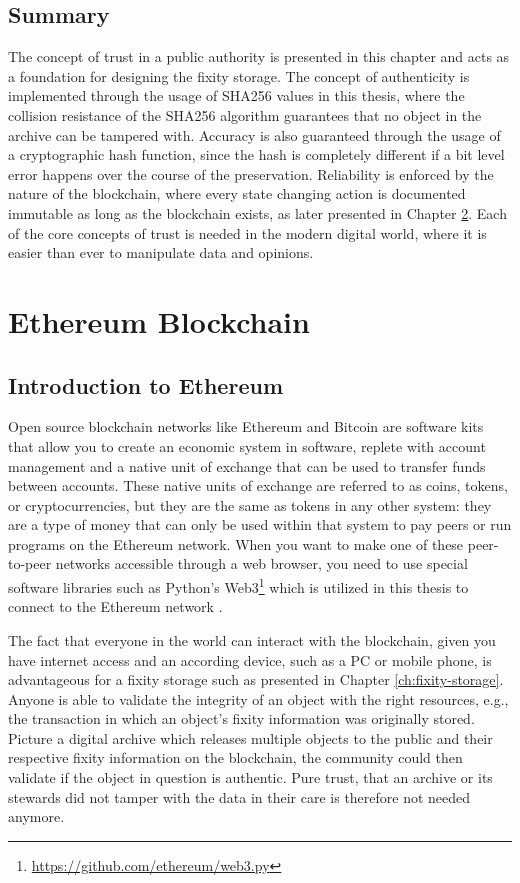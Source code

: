 \documentclass[final]{vutinfth}
\begin{document}
\section{Summary}
The concept of trust in a public authority is presented in this chapter and acts as a foundation for designing the fixity storage. The concept of authenticity is implemented through the usage of SHA256 values in this thesis, where the collision resistance of the SHA256 algorithm guarantees that no object in the archive can be tampered with. Accuracy is also guaranteed through the usage of a cryptographic hash function, since the hash is completely different if a bit level error happens over the course of the preservation.
Reliability is enforced by the nature of the blockchain, where every state changing action is documented immutable as long as the blockchain exists, as later presented in Chapter \ref{ch:ethereum}. Each of the core concepts of trust is needed in the modern digital world, where it is easier than ever to manipulate data and opinions. 
\chapter{Ethereum Blockchain}
\label{ch:ethereum}
\section{Introduction to Ethereum}
\label{sec:eth-blockchain}
Open source blockchain networks like Ethereum and Bitcoin are software kits that allow you to create an economic system in software, replete with account management and a native unit of exchange that can be used to transfer funds between accounts. These native units of exchange are referred to as coins, tokens, or cryptocurrencies, but they are the same as tokens in any other system: they are a type of money that can only be used within that system to pay peers or run programs on the Ethereum network.
When you want to make one of these peer-to-peer networks accessible through a web browser, you need to use special software libraries such as Python's Web3\footnote{\url{https://github.com/ethereum/web3.py}} which is utilized in this thesis to connect to the Ethereum network \cite[2]{dannen2017introducing}.

The fact that everyone in the world can interact with the blockchain, given you have internet access and an according device, such as a PC or mobile phone, is advantageous for a fixity storage such as presented in Chapter \ref{ch:fixity-storage}. Anyone is able to validate the integrity of an object with the right resources, e.g., the transaction in which an object's fixity information was originally stored. Picture a digital archive which releases multiple objects to the public and their respective fixity information on the blockchain, the community could then validate if the object in question is authentic. Pure trust, that an archive or its stewards did not tamper with the data in their care is therefore not needed anymore.
\end{document}
